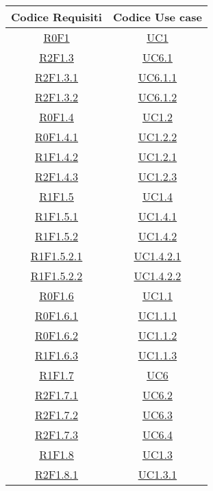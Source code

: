 \normalsize
\begin{longtable}{|c|c|}
\hline
\textbf{Codice Requisiti} & \textbf{Codice Use case} \\
\hline
\endhead
\hyperlink{R0F1}{R0F1} & \hyperlink{UC1}{UC1}\\
\hline
\hyperlink{R2F1.3}{R2F1.3} & \hyperlink{UC6.1}{UC6.1}\\
\hline
\hyperlink{R2F1.3.1}{R2F1.3.1} & \hyperlink{UC6.1.1}{UC6.1.1}\\
\hline
\hyperlink{R2F1.3.2}{R2F1.3.2} & \hyperlink{UC6.1.2}{UC6.1.2}\\
\hline
\hyperlink{R0F1.4}{R0F1.4} & \hyperlink{UC1.2}{UC1.2}\\
\hline
\hyperlink{R0F1.4.1}{R0F1.4.1} & \hyperlink{UC1.2.2}{UC1.2.2}\\
\hline
\hyperlink{R1F1.4.2}{R1F1.4.2} & \hyperlink{UC1.2.1}{UC1.2.1}\\
\hline
\hyperlink{R2F1.4.3}{R2F1.4.3} & \hyperlink{UC1.2.3}{UC1.2.3}\\
\hline
\hyperlink{R1F1.5}{R1F1.5} & \hyperlink{UC1.4}{UC1.4}\\
\hline
\hyperlink{R1F1.5.1}{R1F1.5.1} & \hyperlink{UC1.4.1}{UC1.4.1}\\
\hline
\hyperlink{R1F1.5.2}{R1F1.5.2} & \hyperlink{UC1.4.2}{UC1.4.2}\\
\hline
\hyperlink{R1F1.5.2.1}{R1F1.5.2.1} & \hyperlink{UC1.4.2.1}{UC1.4.2.1}\\
\hline
\hyperlink{R1F1.5.2.2}{R1F1.5.2.2} & \hyperlink{UC1.4.2.2}{UC1.4.2.2}\\
\hline
\hyperlink{R0F1.6}{R0F1.6} & \hyperlink{UC1.1}{UC1.1}\\
\hline
\hyperlink{R0F1.6.1}{R0F1.6.1} & \hyperlink{UC1.1.1}{UC1.1.1}\\
\hline
\hyperlink{R0F1.6.2}{R0F1.6.2} & \hyperlink{UC1.1.2}{UC1.1.2}\\
\hline
\hyperlink{R1F1.6.3}{R1F1.6.3} & \hyperlink{UC1.1.3}{UC1.1.3}\\
\hline
\hyperlink{R1F1.7}{R1F1.7} & \hyperlink{UC6}{UC6}\\
\hline
\hyperlink{R2F1.7.1}{R2F1.7.1} & \hyperlink{UC6.2}{UC6.2}\\
\hline
\hyperlink{R2F1.7.2}{R2F1.7.2} & \hyperlink{UC6.3}{UC6.3}\\
\hline
\hyperlink{R2F1.7.3}{R2F1.7.3} & \hyperlink{UC6.4}{UC6.4}\\
\hline
\hyperlink{R1F1.8}{R1F1.8} & \hyperlink{UC1.3}{UC1.3}\\
\hline
\hyperlink{R2F1.8.1}{R2F1.8.1} & \hyperlink{UC1.3.1}{UC1.3.1}\\

\end{longtable}
